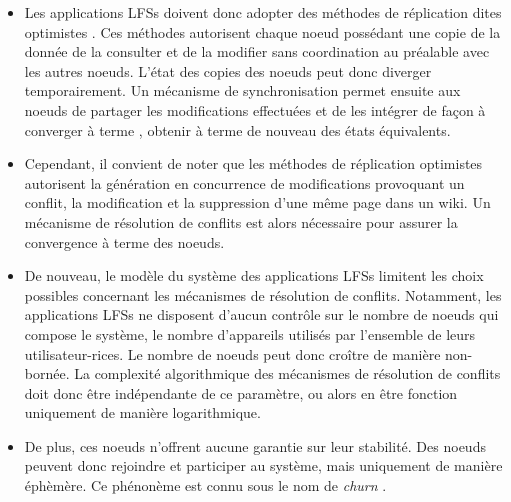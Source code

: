 \begin{itemize}
      Ainsi, pour permettre le fonctionnement en mode hors-ligne de l'application, \ie la consultation et la modification de contenu, les applications \acp{LFS} doivent relaxer la propriété de cohérence des données.
      \begin{definition}[Cohérence]
        La cohérence d'un système indique sa capacité à présenter une vue uniforme de son état à chacun de ses utilisateur-rices à un moment donné.
      \end{definition}
      Les applications \acp{LFS} ne peuvent donc pas reposer sur des méthodes de réplication dites pessimistes, \ie qui empêchent toutes modifications concurrentes d'une même donnée.
    \item Les applications \acp{LFS} doivent donc adopter des méthodes de réplication dites optimistes \cite{2005-optimistic-replication-saito}.
      Ces méthodes autorisent chaque noeud possédant une copie de la donnée de la consulter et de la modifier sans coordination au préalable avec les autres noeuds.
      L'état des copies des noeuds peut donc diverger temporairement.
      Un mécanisme de synchronisation permet ensuite aux noeuds de partager les modifications effectuées et de les intégrer de façon à converger à terme \cite{10.1145/224057.224070}, \ie obtenir à terme de nouveau des états équivalents.
    \item Cependant, il convient de noter que les méthodes de réplication optimistes autorisent la génération en concurrence de modifications provoquant un conflit, \eg la modification et la suppression d'une même page dans un wiki.
      Un mécanisme de résolution de conflits est alors nécessaire pour assurer la convergence à terme des noeuds.
    \item De nouveau, le modèle du système des applications \acp{LFS} limitent les choix possibles concernant les mécanismes de résolution de conflits.
      Notamment, les applications \acp{LFS} ne disposent d'aucun contrôle sur le nombre de noeuds qui compose le système, \ie le nombre d'appareils utilisés par l'ensemble de leurs utilisateur-rices.
      Le nombre de noeuds peut donc croître de manière non-bornée.
      La complexité algorithmique des mécanismes de résolution de conflits doit donc être indépendante de ce paramètre, ou alors en être fonction uniquement de manière logarithmique.
    \item De plus, ces noeuds n'offrent aucune garantie sur leur stabilité.
      Des noeuds peuvent donc rejoindre et participer au système, mais uniquement de manière éphèmère.
      Ce phénonème est connu sous le nom de \emph{churn} \cite{understandingChurnP2PNetworks2006}.

\end{itemize}

